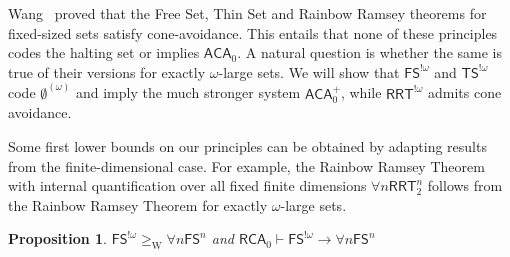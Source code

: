 \documentclass{article}
\newcommand{\RCA}[0]{\mathsf{RCA}}
\newcommand{\ACA}[0]{\mathsf{ACA}}
\newcommand{\RRT}[0]{\mathsf{RRT}}
\newcommand{\FS}[0]{\mathsf{FS}}
\newcommand{\TS}[0]{\mathsf{TS}}
\newcommand{\NN}[0]{\mathbb{N}}
\newcommand{\W}{\mathrm{W}}
\numberwithin{theorem}{section}
\newtheorem{proposition}[theorem]{Proposition}
\newcommand{\ludovic}[1]{\textcolor{blue}{#1}}
\newcommand{\lorenzo}[1]{\textcolor{orange}{#1}}
\begin{document}

Wang~\cite{wang2014some} proved that the Free Set, Thin Set and Rainbow Ramsey theorems for fixed-sized sets satisfy cone-avoidance. This entails that none of these principles codes the halting set or implies $\ACA_0$.
A natural question is whether the same is true of their versions for exactly $\omega$-large sets.
We will show that $\FS^{!\omega}$ and $\TS^{!\omega}$ code $\emptyset^{(\omega)}$ and imply the much stronger system $\ACA_0^+$, while $\RRT^{!\omega}$ admits cone avoidance.

\bigskip

Some first lower bounds on our principles can be obtained by adapting results from the finite-dimensional case. For example, the Rainbow Ramsey Theorem with internal quantification over all fixed finite dimensions $\forall n \RRT^n_2$ follows from the Rainbow Ramsey Theorem for exactly $\omega$-large sets. 

\iffalse
\begin{proposition}
$\FS^{!\omega} \geq_{\W} \forall n \FS^n$ and $\RCA_0\vdash \FS^{!\omega} \to \forall n \FS^n$
\end{proposition}
\end{document}
